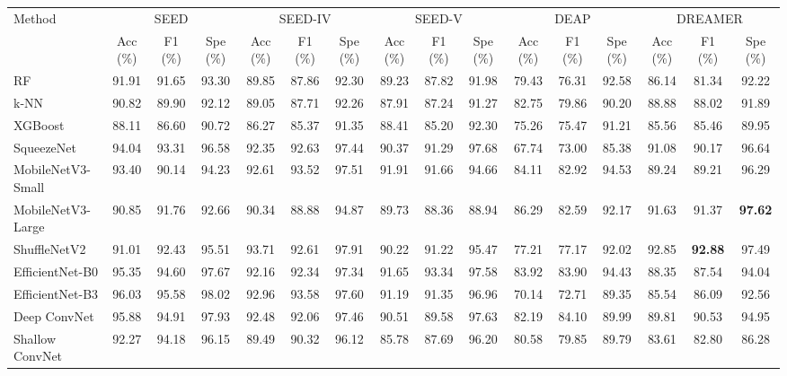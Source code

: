 \documentclass{nsr}
\begin{document}
\begin{table}[t]
\begin{minipage}{1.2\textwidth}
{\begin{tabular}{l*{15}{c}}
\toprule
\multirow{2}{*}{Method}
& \multicolumn{3}{c}{SEED}
& \multicolumn{3}{c}{SEED-IV}
& \multicolumn{3}{c}{SEED-V}
& \multicolumn{3}{c}{DEAP}
& \multicolumn{3}{c}{DREAMER} \\
\cmidrule(lr){2-4}\cmidrule(lr){5-7}\cmidrule(lr){8-10}\cmidrule(lr){11-13}\cmidrule(lr){14-16}
& {Acc (\%)} & {F1 (\%)} & {Spe (\%)}
& {Acc (\%)} & {F1 (\%)} & {Spe (\%)}
& {Acc (\%)} & {F1 (\%)} & {Spe (\%)}
& {Acc (\%)} & {F1 (\%)} & {Spe (\%)}
& {Acc (\%)} & {F1 (\%)} & {Spe (\%)} \\
\midrule
RF\cite{ref52} & 91.91 & 91.65 & 93.30 & 89.85 & 87.86 & 92.30 & 89.23 & 87.82 & 91.98 & 79.43 & 76.31 & 92.58 & 86.14 & 81.34 & 92.22 \\
k-NN\cite{ref53} & 90.82 & 89.90 & 92.12 & 89.05 & 87.71 & 92.26 & 87.91 & 87.24 & 91.27 & 82.75 & 79.86 & 90.20 & 88.88 & 88.02 & 91.89 \\
XGBoost\cite{ref54} & 88.11 & 86.60 & 90.72 & 86.27 & 85.37 & 91.35 & 88.41 & 85.20 & 92.30 & 75.26 & 75.47 & 91.21 & 85.56 & 85.46 & 89.95 \\
SqueezeNet\cite{ref57} & 94.04 & 93.31 & 96.58 & 92.35 & 92.63 & 97.44 & 90.37 & 91.29 & 97.68 & 67.74 & 73.00 & 85.38 & 91.08 & 90.17 & 96.64 \\
MobileNetV3-Small\cite{ref58} & 93.40 & 90.14 & 94.23 & 92.61 & 93.52 & 97.51 & 91.91 & 91.66 & 94.66 & 84.11 & 82.92 & 94.53 & 89.24 & 89.21 & 96.29 \\
MobileNetV3-Large\cite{ref58} & 90.85 & 91.76 & 92.66 & 90.34 & 88.88 & 94.87 & 89.73 & 88.36 & 88.94 & 86.29 & 82.59 & 92.17 & 91.63 & 91.37 & \textbf{97.62} \\
ShuffleNetV2\cite{ref59} & 91.01 & 92.43 & 95.51 & 93.71 & 92.61 & 97.91 & 90.22 & 91.22 & 95.47 & 77.21 & 77.17 & 92.02 & 92.85 & \textbf{92.88} & 97.49 \\
EfficientNet-B0\cite{ref60} & 95.35 & 94.60 & 97.67 & 92.16 & 92.34 & 97.34 & 91.65 & 93.34 & 97.58 & 83.92 & 83.90 & 94.43 & 88.35 & 87.54 & 94.04 \\
EfficientNet-B3\cite{ref60} & 96.03 & 95.58 & 98.02 & 92.96 & 93.58 & 97.60 & 91.19 & 91.35 & 96.96 & 70.14 & 72.71 & 89.35 & 85.54 & 86.09 & 92.56 \\
Deep ConvNet\cite{ref55} & 95.88 & 94.91 & 97.93 & 92.48 & 92.06 & 97.46 & 90.51 & 89.58 & 97.63 & 82.19 & 84.10 & 89.99 & 89.81 & 90.53 & 94.95 \\
Shallow ConvNet\cite{ref55} & 92.27 & 94.18 & 96.15 & 89.49 & 90.32 & 96.12 & 85.78 & 87.69 & 96.20 & 80.58 & 79.85 & 89.79 & 83.61 & 82.80 & 86.28 \\

\end{tabular}}
\end{minipage}
\end{table}
\end{document}
